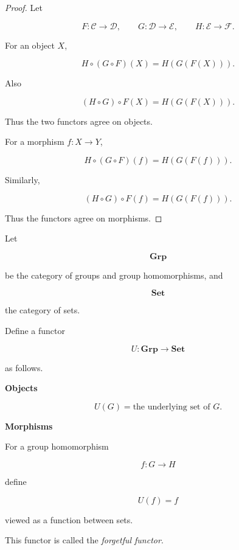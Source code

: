 \begin{proof}

Let

$$
F : \mathcal{C} \to \mathcal{D},
\qquad
G : \mathcal{D} \to \mathcal{E},
\qquad
H : \mathcal{E} \to \mathcal{F}.
$$

For an object $X$,

$$
H \circ (G \circ F)(X)
=
H(G(F(X))).
$$

Also

$$
(H \circ G) \circ F (X)
=
H(G(F(X))).
$$

Thus the two functors agree on objects.

For a morphism $f : X \to Y$,

$$
H \circ (G \circ F)(f)
=
H(G(F(f))).
$$

Similarly,

$$
(H \circ G) \circ F (f)
=
H(G(F(f))).
$$

Thus the functors agree on morphisms.

\end{proof}


\begin{example}
\label{ex:forgetful}

Let

$$
\mathbf{Grp}
$$

be the category of groups and group homomorphisms, and

$$
\mathbf{Set}
$$

the category of sets.

Define a functor

$$
U : \mathbf{Grp} \to \mathbf{Set}
$$

as follows.

\textbf{Objects}

$$
U(G) = \text{the underlying set of } G.
$$

\textbf{Morphisms}

For a group homomorphism

$$
f : G \to H
$$

define

$$
U(f) = f
$$

viewed as a function between sets.

This functor is called the \emph{forgetful functor}.

\end{example}

